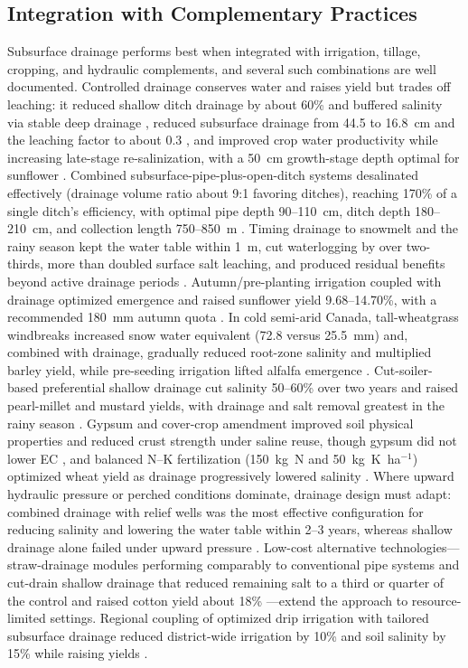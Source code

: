 \subsection{Integration with Complementary Practices}

Subsurface drainage performs best when integrated with irrigation, tillage, cropping, and hydraulic complements, and several such combinations are well documented. Controlled drainage conserves water and raises yield but trades off leaching: it reduced shallow ditch drainage by about 60\% and buffered salinity via stable deep drainage \parencite{Jia2007}, reduced subsurface drainage from 44.5 to 16.8~cm and the leaching factor to about 0.3 \parencite{Jia2007}, and improved crop water productivity while increasing late-stage re-salinization, with a 50~cm growth-stage depth optimal for sunflower \parencite{Dou2022}. Combined subsurface-pipe-plus-open-ditch systems desalinated effectively (drainage volume ratio about 9:1 favoring ditches), reaching 170\% of a single ditch's efficiency, with optimal pipe depth 90--110~cm, ditch depth 180--210~cm, and collection length 750--850~m \parencite{Yao2024}. Timing drainage to snowmelt and the rainy season kept the water table within 1~m, cut waterlogging by over two-thirds, more than doubled surface salt leaching, and produced residual benefits beyond active drainage periods \parencite{Yu2016}. Autumn/pre-planting irrigation coupled with drainage optimized emergence and raised sunflower yield 9.68--14.70\%, with a recommended 180~mm autumn quota \parencite{Liu2023,Liu2025c}. In cold semi-arid Canada, tall-wheatgrass windbreaks increased snow water equivalent (72.8 versus 25.5~mm) and, combined with drainage, gradually reduced root-zone salinity and multiplied barley yield, while pre-seeding irrigation lifted alfalfa emergence \parencite{Steppuhn2006,Steppuhn2017}. Cut-soiler-based preferential shallow drainage cut salinity 50--60\% over two years and raised pearl-millet and mustard yields, with drainage and salt removal greatest in the rainy season \parencite{Neha2022,Neha2022b}. Gypsum and cover-crop amendment improved soil physical properties and reduced crust strength under saline reuse, though gypsum did not lower EC \parencite{MANN1982,Mitchell2000}, and balanced N--K fertilization (150~kg~N and 50~kg~K~ha$^{-1}$) optimized wheat yield as drainage progressively lowered salinity \parencite{Singh2001b}. Where upward hydraulic pressure or perched conditions dominate, drainage design must adapt: combined drainage with relief wells was the most effective configuration for reducing salinity and lowering the water table within 2--3 years, whereas shallow drainage alone failed under upward pressure \parencite{Benyamini2005,Mirlas2003}. Low-cost alternative technologies---straw-drainage modules performing comparably to conventional pipe systems \parencite{Lu2019} and cut-drain shallow drainage that reduced remaining salt to a third or quarter of the control and raised cotton yield about 18\% \parencite{Okuda2020}---extend the approach to resource-limited settings. Regional coupling of optimized drip irrigation with tailored subsurface drainage reduced district-wide irrigation by 10\% and soil salinity by 15\% while raising yields \parencite{Liu2026}.

